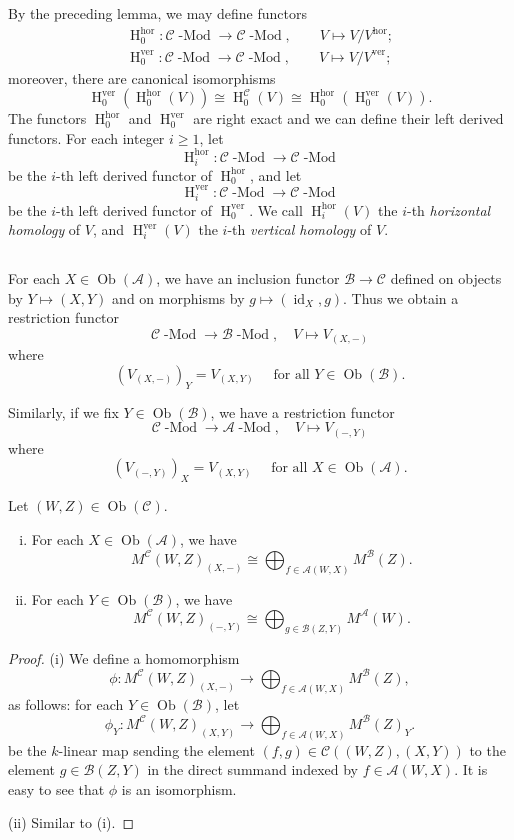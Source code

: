 \documentclass{amsart}
\numberwithin{equation}{section}
\DeclareMathOperator{\Mod}{-Mod}
\DeclareMathOperator{\HH}{H}
\DeclareMathOperator{\Ob}{Ob}
\DeclareMathOperator{\id}{id}
\newcommand{\C}{{\mathscr{C}}}
\newcommand{\A}{{\mathscr{A}}}
\newcommand{\B}{{\mathscr{B}}}
\newcommand{\hor}{{\mathrm{hor}}}
\newcommand{\ver}{{\mathrm{ver}}}
\begin{document}
By the preceding lemma, we may define functors 
\begin{gather*} 
\HH^\hor_0 : \C\Mod \to \C\Mod, \qquad V\mapsto V/V^\hor;\\
\HH^\ver_0 : \C\Mod \to \C\Mod , \qquad V\mapsto V/V^\ver;
\end{gather*}
moreover, there are canonical isomorphisms
\begin{equation} \label{vhor and vver}
\HH^\ver_0 (\HH^\hor_0 (V)) \cong \HH^\C_0(V) \cong \HH^\hor_0 (\HH^\ver_0 (V)). 
\end{equation}
The functors $\HH^\hor_0$ and $\HH^\ver_0$ are right exact and we can define their left derived functors.
For each integer $i\geqslant 1$, let 
\[ \HH^\hor_i : \C\Mod\to\C\Mod \] 
be the $i$-th left derived functor of $\HH^\hor_0$, and let 
\[ \HH^\ver_i : \C\Mod\to\C\Mod \] 
be the $i$-th left derived functor of $\HH^\ver_0$. We call $\HH^\hor_i(V)$ the $i$-th \emph{horizontal homology} of $V$, and $\HH^\ver_i(V)$ the $i$-th \emph{vertical homology} of $V$.


\subsection{}
For each $X\in \Ob(\A)$, we have an inclusion functor $\B \to \C$ defined on objects by $Y\mapsto (X,Y)$ and on morphisms by $g\mapsto (\id_X, g)$. Thus we obtain a restriction functor 
\[ \C\Mod \to \B\Mod, \quad V\mapsto V_{(X,-)} \]
where
\[ (V_{(X,-)})_Y = V_{(X,Y)} \quad\mbox{ for all }Y\in \Ob(\B). \]

Similarly, if we fix $Y\in \Ob(\B)$, we have a restriction functor 
\[ \C\Mod \to \A\Mod, \quad V \mapsto V_{(-,Y)} \]
where
\[ (V_{(-,Y)})_X = V_{(X,Y)} \quad\mbox{ for all }X\in \Ob(\A). \]


\begin{lemma} \label{restriction of free modules}
   Let $(W,Z)\in \Ob(\C)$. 
   \begin{enumerate}[(i)]
      \item For each $X\in \Ob(\A)$, we have 
      \[  M^{\C}(W,Z)_{(X,-)} \cong \bigoplus_{f\in \A(W,X)} M^{\B}(Z). \]
      \item For each $Y\in \Ob(\B)$, we have 
      \[  M^{\C}(W,Z)_{(-,Y)} \cong \bigoplus_{g\in \B(Z,Y)} M^{\A}(W). \]
   \end{enumerate}
\end{lemma}

\begin{proof} 
   (i) We define a homomorphism 
   \[ \phi: M^{\C}(W,Z)_{(X,-)} \to \bigoplus_{f\in \A(W,X)} M^{\B}(Z), \]
   as follows: for each $Y\in \Ob(\B)$, let 
   \[ \phi_Y : M^{\C}(W,Z)_{(X,Y)} \to \bigoplus_{f\in \A(W,X)} M^{\B}(Z)_Y. \]
   be the $k$-linear map sending the element $(f,g)\in \C((W,Z), (X,Y))$ to the element $g\in \B(Z,Y)$ in the direct summand indexed by $f\in \A(W,X)$. It is easy to see that $\phi$ is an isomorphism.

   (ii) Similar to (i).
\end{proof} 
\end{document}
